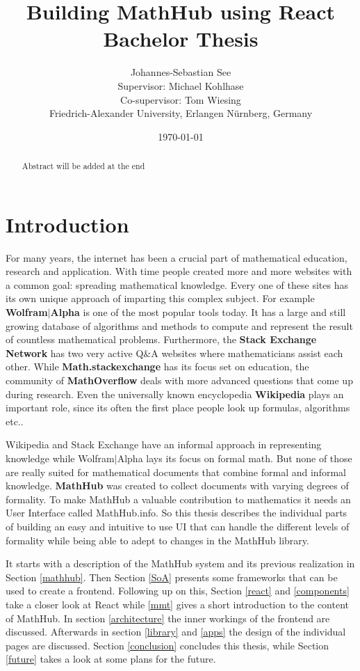 \documentclass[11pt,a4paper]{article}
\title{Building MathHub using React\\ \vspace{2 mm} Bachelor Thesis}
\author{Johannes-Sebastian See\\Supervisor: Michael Kohlhase\\Co-supervisor: Tom Wiesing\\Friedrich-Alexander University, Erlangen Nürnberg, Germany}
\date{\today}
\begin{document}
\begin{titlepage}
\maketitle
\begin{abstract}
Abstract will be added at the end
\end{abstract}

\end{titlepage}

\tableofcontents
\pagebreak
\section{Introduction}
For many years, the internet has been a crucial part of mathematical education, research and application. 
With time people created more and more websites with a common goal: spreading mathematical knowledge.
Every one of these sites has its own unique approach of imparting this complex subject.
For example \textbf{Wolfram$|$Alpha} \cite{wolfram} is one of the most popular tools today.
It has a large and still growing database of algorithms and methods to compute and represent the result of countless mathematical problems.
Furthermore, the \textbf{Stack Exchange Network} has two very active Q$\&$A websites where mathematicians assist each other.
While \textbf{Math.stackexchange} has its focus set on education, the community of \textbf{MathOverflow} deals with more advanced questions that come up during research.
Even the universally known encyclopedia \textbf{Wikipedia} plays an important role, since its often the first place people look up formulas, algorithms etc..

Wikipedia and Stack Exchange have an informal approach in representing knowledge while Wolfram$|$Alpha lays its focus on formal math.
But none of those are really suited for mathematical documents that combine formal and informal knowledge.
\textbf{MathHub}\cite{MathHub} was created to collect documents with varying degrees of formality.
To make MathHub a valuable contribution to mathematics it needs an User Interface called MathHub.info.
So this thesis describes the individual parts of building an easy and intuitive to use UI that can handle the different levels of formality while being able to adept to changes in the MathHub library.

It starts with a description of the MathHub system and its previous realization in Section \ref{mathhub}.
Then Section \ref{SoA} presents some frameworks that can be used to create a frontend.
Following up on this, Section \ref{react} and \ref{components} take a closer look at React while \ref{mmt} gives a short introduction to the content of MathHub.
In section \ref{architecture} the inner workings of the frontend are discussed.
Afterwards in section \ref{library} and \ref{apps} the design of the individual pages are discussed.
Section \ref{conclusion} concludes this thesis, while Section \ref{future} takes a look at some plans for the future.
\end{document}
